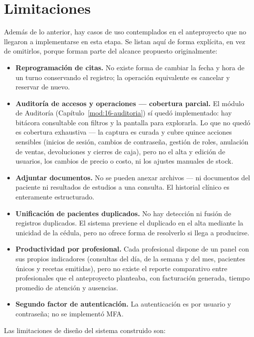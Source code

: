 \section{Limitaciones}
\label{sec:conclusiones-limitaciones}

Además de lo anterior, hay casos de uso contemplados en el anteproyecto que no llegaron a implementarse en esta etapa. Se listan aquí de forma explícita, en vez de omitirlos, porque forman parte del alcance propuesto originalmente:

\begin{itemize}
  \item \textbf{Reprogramación de citas.} No existe forma de cambiar la fecha y hora de un turno conservando el registro; la operación equivalente es cancelar y reservar de nuevo.
  \item \textbf{Auditoría de accesos y operaciones --- cobertura parcial.} El módulo de Auditoría (Capítulo~\ref{mod:16-auditoria}) sí quedó implementado: hay bitácora consultable con filtros y la pantalla para explorarla. Lo que no quedó es cobertura exhaustiva --- la captura es curada y cubre quince acciones sensibles (inicios de sesión, cambios de contraseña, gestión de roles, anulación de ventas, devoluciones y cierres de caja), pero no el alta y edición de usuarios, los cambios de precio o costo, ni los ajustes manuales de stock.
  \item \textbf{Adjuntar documentos.} No se pueden anexar archivos --- ni documentos del paciente ni resultados de estudios a una consulta. El historial clínico es enteramente estructurado.
  \item \textbf{Unificación de pacientes duplicados.} No hay detección ni fusión de registros duplicados. El sistema previene el duplicado en el alta mediante la unicidad de la cédula, pero no ofrece forma de resolverlo si llega a producirse.
  \item \textbf{Productividad por profesional.} Cada profesional dispone de un panel con sus propios indicadores (consultas del día, de la semana y del mes, pacientes únicos y recetas emitidas), pero no existe el reporte comparativo entre profesionales que el anteproyecto planteaba, con facturación generada, tiempo promedio de atención y ausencias.
  \item \textbf{Segundo factor de autenticación.} La autenticación es por usuario y contraseña; no se implementó MFA.
\end{itemize}

Las limitaciones de diseño del sistema construido son:


